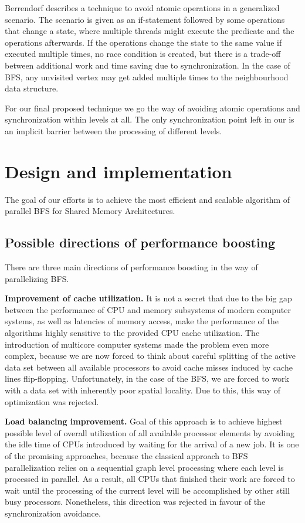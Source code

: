 \documentclass[letterpaper]{article}
\begin{document}
		Berrendorf\cite{Berrendorf:14} describes a technique to avoid atomic operations in a generalized scenario. 
		The scenario is given as an if-statement followed by some operations that change a state, where multiple threads might execute the predicate and the operations afterwards. 
		If the operations change the state to the same value if executed multiple times, no race condition is created, but there is a trade-off between additional work and time saving due to synchronization.
		In the case of BFS, any unvisited vertex may get added multiple times to the neighbourhood data structure.		
	
		For our final proposed technique we go the way of avoiding atomic operations and synchronization within levels at all.
		The only synchronization point left in our is an implicit barrier between the processing of different levels.
	
	
	\section{Design and implementation}\label{sec:deim} %
		The goal of our efforts is to achieve the most efficient and scalable algorithm of parallel BFS for Shared Memory Architectures. 

		\subsection{Possible directions of performance boosting}
			There are three main directions of performance boosting in the way of parallelizing BFS.
			
			\textbf{Improvement of cache utilization.}
			It is not a secret that due to the big gap between the performance of CPU and memory subsystems of modern computer systems, as well as latencies of memory access, make the performance of the algorithms highly sensitive to the provided CPU cache utilization. 
			The introduction of multicore computer systems made the problem even more complex, because we are now forced to think about careful splitting of the active data set between all available processors to avoid cache misses induced by cache lines flip-flopping. 
			Unfortunately, in the case of the BFS, we are forced to work with a data set with inherently poor spatial locality. 
			Due to this, this way of optimization was rejected.
			
			\textbf{Load balancing improvement.} 
			Goal of this approach is to achieve highest possible level of overall utilization of all available processor elements by avoiding the idle time of CPUs introduced by waiting for the arrival of a new job.
			It is one of the promising approaches, because the classical approach to BFS parallelization relies on a sequential graph level processing where each level is processed in parallel.
			As a result, all CPUs that finished their work are forced to wait until the processing of the current level will be accomplished by other still busy processors.
			Nonetheless, this direction was rejected in favour of the synchronization avoidance. 
			
\end{document}
